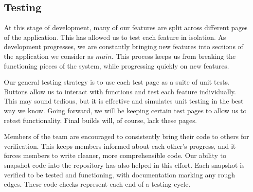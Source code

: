 \documentclass[12pt]{article}
\newenvironment{itemize*}%
  {\begin{itemize}%
  	\setlength{\parsep}{0pt}
    \setlength{\itemsep}{0pt}%
    \setlength{\parskip}{0pt}}%
  {\end{itemize}}
\begin{document}
\begin{itemize*}
\subsection{Testing}
At this stage of development, many of our features are split across different pages of the application.  This has allowed us to test each feature in isolation.  As development progresses, we are constantly bringing new features into sections of the application we consider as $main$.  This process keeps us from breaking the functioning pieces of the system, while progressing quickly on new features.

Our general testing strategy is to use each test page as a suite of unit tests.  Buttons allow us to interact with functions and test each feature individually.  This may sound tedious, but it is effective and simulates unit testing in the best way we know.  Going forward, we will be keeping certain test pages to allow us to retest functionality.  Final builds will, of course, lack these pages.

Members of the team are encouraged to consistently bring their code to others for verification.  This keeps members informed about each other's progress, and it forces members to write cleaner, more comprehensible code.  Our ability to snapshot code into the repository has also helped in this effort.  Each snapshot is verified to be tested and functioning, with documentation marking any rough edges.  These code checks represent each end of a testing cycle.



\end{itemize*}
\end{document}
